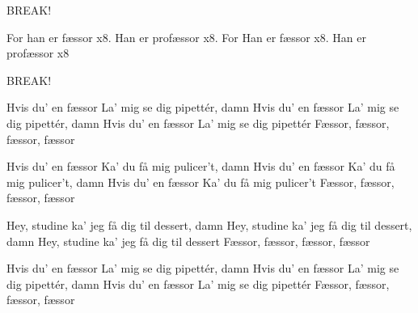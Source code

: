 \documentclass[a4paper,11pt]{article}
\begin{document}
\begin{song}
BREAK!
 
For han er fæssor x8. 
Han er profæssor x8.
For Han er fæssor x8. 
Han er profæssor x8

BREAK!

Hvis du' en fæssor
La' mig se dig pipettér, damn
Hvis du' en fæssor
La' mig se dig pipettér, damn
Hvis du' en fæssor
La' mig se dig pipettér
Fæssor, fæssor, fæssor, fæssor

Hvis du' en fæssor
Ka' du få mig pulicer't, damn
Hvis du' en fæssor
Ka' du få mig pulicer't, damn
Hvis du' en fæssor
Ka' du få mig pulicer't
Fæssor, fæssor, fæssor, fæssor

Hey, studine ka' jeg få dig til dessert, damn
Hey, studine ka' jeg få dig til dessert, damn
Hey, studine ka' jeg få dig til dessert
Fæssor, fæssor, fæssor, fæssor

Hvis du' en fæssor
La' mig se dig pipettér, damn
Hvis du' en fæssor
La' mig se dig pipettér, damn
Hvis du' en fæssor
La' mig se dig pipettér
Fæssor, fæssor, fæssor, fæssor

\end{song}
\end{document}

